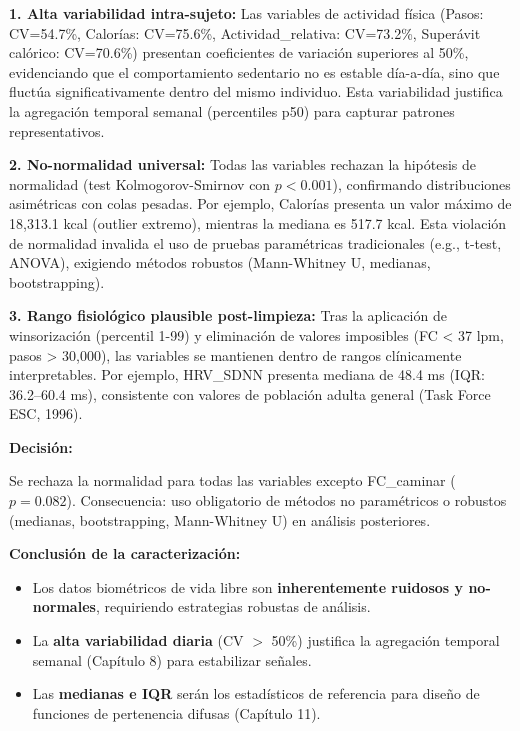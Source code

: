 \documentclass[12pt,letterpaper,twoside]{report}
\begin{document}
\textbf{1. Alta variabilidad intra-sujeto:} Las variables de actividad física (Pasos: CV=54.7\%, Calorías: CV=75.6\%, Actividad\_relativa: CV=73.2\%, Superávit calórico: CV=70.6\%) presentan coeficientes de variación superiores al 50\%, evidenciando que el comportamiento sedentario no es estable día-a-día, sino que fluctúa significativamente dentro del mismo individuo. Esta variabilidad justifica la agregación temporal semanal (percentiles p50) para capturar patrones representativos.

\textbf{2. No-normalidad universal:} Todas las variables rechazan la hipótesis de normalidad (test Kolmogorov-Smirnov con $p < 0.001$), confirmando distribuciones asimétricas con colas pesadas. Por ejemplo, Calorías presenta un valor máximo de 18,313.1 kcal (outlier extremo), mientras la mediana es 517.7 kcal. Esta violación de normalidad invalida el uso de pruebas paramétricas tradicionales (e.g., t-test, ANOVA), exigiendo métodos robustos (Mann-Whitney U, medianas, bootstrapping).

\textbf{3. Rango fisiológico plausible post-limpieza:} Tras la aplicación de winsorización (percentil 1-99) y eliminación de valores imposibles (FC < 37 lpm, pasos > 30,000), las variables se mantienen dentro de rangos clínicamente interpretables. Por ejemplo, HRV\_SDNN presenta mediana de 48.4 ms (IQR: 36.2--60.4 ms), consistente con valores de población adulta general (Task Force ESC, 1996).

\begin{decisionbox}
\textbf{Decisión:}

Se rechaza la normalidad para todas las variables excepto FC\_caminar ($p=0.082$). Consecuencia: uso obligatorio de métodos no paramétricos o robustos (medianas, bootstrapping, Mann-Whitney U) en análisis posteriores.
\end{decisionbox}

\begin{conclusionbox}
\textbf{Conclusión de la caracterización:}

\begin{itemize}[noitemsep]
    \item Los datos biométricos de vida libre son \textbf{inherentemente ruidosos y no-normales}, requiriendo estrategias robustas de análisis.
    \item La \textbf{alta variabilidad diaria} (CV $>$ 50\%) justifica la agregación temporal semanal (Capítulo 8) para estabilizar señales.
    \item Las \textbf{medianas e IQR} serán los estadísticos de referencia para diseño de funciones de pertenencia difusas (Capítulo 11).
\end{itemize}
\end{conclusionbox}
\end{document}
